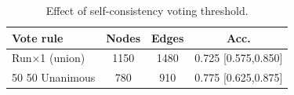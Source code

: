 \begin{table}[t]
\centering
\caption{Effect of self-consistency voting threshold.}
\label{tab:voting}
\begin{tabular}{lccc}
\toprule
Vote rule & Nodes & Edges & Acc. \\
\midrule
Run×1 (union) & 1150 & 1480 & 0.725 [0.575,0.850] \\
50%
50%
Unanimous & 780 & 910 & 0.775 [0.625,0.875] \\
\bottomrule
\end{tabular}
\end{table}